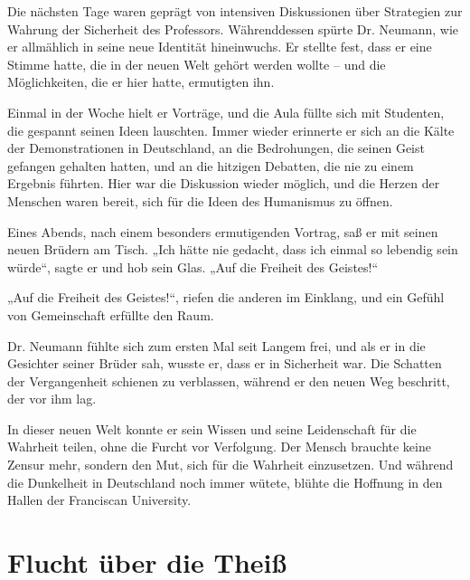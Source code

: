 \documentclass[
]{article}
\begin{document}
Die nächsten Tage waren geprägt von intensiven Diskussionen über
Strategien zur Wahrung der Sicherheit des Professors. Währenddessen
spürte Dr. Neumann, wie er allmählich in seine neue Identität
hineinwuchs. Er stellte fest, dass er eine Stimme hatte, die in der
neuen Welt gehört werden wollte -- und die Möglichkeiten, die er hier
hatte, ermutigten ihn.

Einmal in der Woche hielt er Vorträge, und die Aula füllte sich mit
Studenten, die gespannt seinen Ideen lauschten. Immer wieder erinnerte
er sich an die Kälte der Demonstrationen in Deutschland, an die
Bedrohungen, die seinen Geist gefangen gehalten hatten, und an die
hitzigen Debatten, die nie zu einem Ergebnis führten. Hier war die
Diskussion wieder möglich, und die Herzen der Menschen waren bereit,
sich für die Ideen des Humanismus zu öffnen.

Eines Abends, nach einem besonders ermutigenden Vortrag, saß er mit
seinen neuen Brüdern am Tisch. „Ich hätte nie gedacht, dass ich einmal
so lebendig sein würde``, sagte er und hob sein Glas. „Auf die Freiheit
des Geistes!{\kern0pt}``

„Auf die Freiheit des Geistes!{\kern0pt}``, riefen die anderen im
Einklang, und ein Gefühl von Gemeinschaft erfüllte den Raum.

Dr. Neumann fühlte sich zum ersten Mal seit Langem frei, und als er in
die Gesichter seiner Brüder sah, wusste er, dass er in Sicherheit war.
Die Schatten der Vergangenheit schienen zu verblassen, während er den
neuen Weg beschritt, der vor ihm lag.

In dieser neuen Welt konnte er sein Wissen und seine Leidenschaft für
die Wahrheit teilen, ohne die Furcht vor Verfolgung. Der Mensch brauchte
keine Zensur mehr, sondern den Mut, sich für die Wahrheit einzusetzen.
Und während die Dunkelheit in Deutschland noch immer wütete, blühte die
Hoffnung in den Hallen der Franciscan University.

\section{Flucht über die Theiß}\label{flucht-uxfcber-die-theiuxdf}
\end{document}
